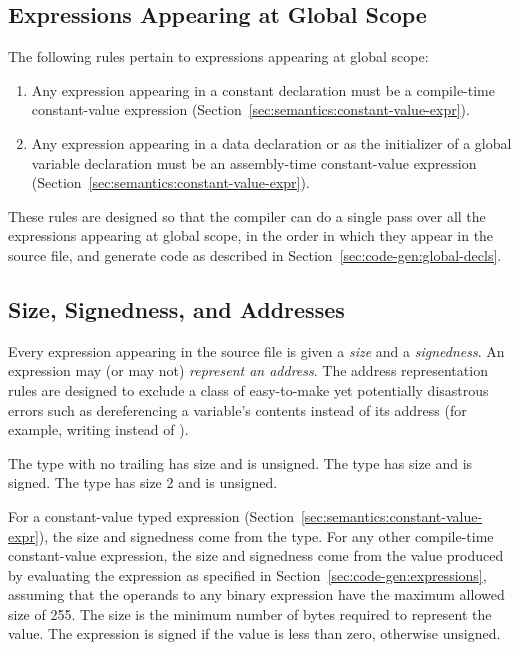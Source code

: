 \documentclass[10pt]{article}
\begin{document}
\subsection{Expressions Appearing at Global Scope}
\label{sec:semantic:global-expr}

The following rules pertain to expressions appearing at global scope:
%
\begin{enumerate}
%
\item Any expression appearing in a constant declaration must be a
  compile-time constant-value expression
  (Section~\ref{sec:semantics:constant-value-expr}).
%
\item Any expression appearing in a data declaration or as the
  initializer of a global variable declaration must be an
  assembly-time constant-value expression
  (Section~\ref{sec:semantics:constant-value-expr}).
%
\end{enumerate}
%
These rules are designed so that the compiler can do a single pass
over all the expressions  appearing at global scope, in
the order in which they appear in the source file, and generate code
as described in Section~\ref{sec:code-gen:global-decls}.

\subsection{Size, Signedness, and Addresses}
\label{sec:semantics:size}

Every expression appearing in the source file is given a \emph{size}
and a \emph{signedness}.  An expression may (or may not)
\emph{represent an address}.  The address representation rules are
designed to exclude a class of easy-to-make yet potentially disastrous
errors such as dereferencing a variable's contents instead of its
address (for example, writing  instead of
).

 The type
 with no trailing  has size  and is
unsigned.  The type   has size  and
is signed.  The type  has size 2 and is unsigned.

 For a
constant-value typed expression
(Section~\ref{sec:semantics:constant-value-expr}), the size and
signedness come from the type.  For any other compile-time
constant-value expression, the size and signedness come from the value
produced by evaluating the expression as specified in
Section~\ref{sec:code-gen:expressions}, assuming that the operands to
any binary expression have the maximum allowed size of 255.  The size
is the minimum number of bytes required to represent the value.  The
expression is signed if the value is less than zero, otherwise
unsigned.
\end{document}

